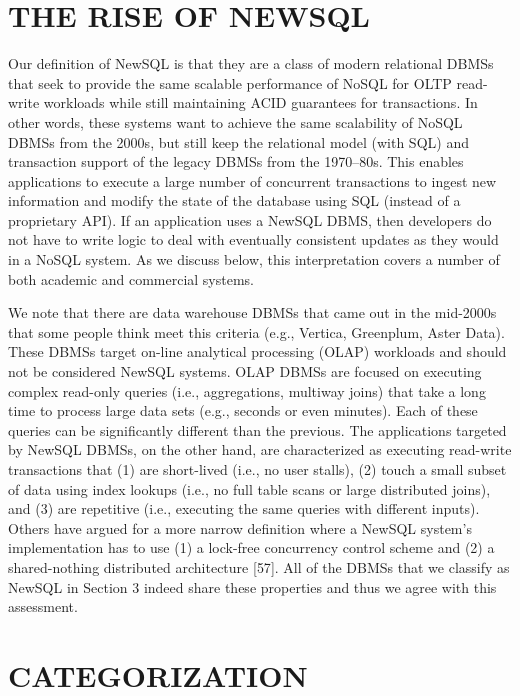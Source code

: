 \documentclass[a4paper,12pt,notitlepage,twoside,openright]{article}
\begin{document}
\hypertarget{the-rise-of-newsql}{%
\section{THE RISE OF NEWSQL}\label{the-rise-of-newsql}}

Our definition of NewSQL is that they are a class of modern relational
DBMSs that seek to provide the same scalable performance of NoSQL for
OLTP read-write workloads while still maintaining ACID guarantees for
transactions. In other words, these systems want to achieve the same
scalability of NoSQL DBMSs from the 2000s, but still keep the relational
model (with SQL) and transaction support of the legacy DBMSs from the
1970--80s. This enables applications to execute a large number of
concurrent transactions to ingest new information and modify the state
of the database using SQL (instead of a proprietary API). If an
application uses a NewSQL DBMS, then developers do not have to write
logic to deal with eventually consistent updates as they would in a
NoSQL system. As we discuss below, this interpretation covers a number
of both academic and commercial systems.

We note that there are data warehouse DBMSs that came out in the
mid-2000s that some people think meet this criteria (e.g., Vertica,
Greenplum, Aster Data). These DBMSs target on-line analytical processing
(OLAP) workloads and should not be considered NewSQL systems. OLAP DBMSs
are focused on executing complex read-only queries (i.e., aggregations,
multiway joins) that take a long time to process large data sets (e.g.,
seconds or even minutes). Each of these queries can be significantly
different than the previous. The applications targeted by NewSQL DBMSs,
on the other hand, are characterized as executing read-write
transactions that (1) are short-lived (i.e., no user stalls), (2) touch
a small subset of data using index lookups (i.e., no full table scans or
large distributed joins), and (3) are repetitive (i.e., executing the
same queries with different inputs). Others have argued for a more
narrow definition where a NewSQL system's implementation has to use (1)
a lock-free concurrency control scheme and (2) a shared-nothing
distributed architecture {[}57{]}. All of the DBMSs that we classify as
NewSQL in Section 3 indeed share these properties and thus we agree with
this assessment.

\hypertarget{categorization}{%
\section{CATEGORIZATION}\label{categorization}}
\end{document}

